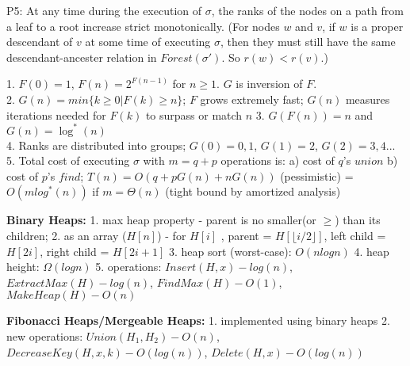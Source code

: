 P5: At any time during the execution of $\sigma$, the ranks of the nodes
on a path from a leaf to a root increase strict monotonically.
(For nodes $w$ and $v$, if $w$ is a proper descendant of $v$ at some time of executing $\sigma$,
then they must still have the same descendant-ancester relation in $Forest(\sigma')$. So $r(w)<r(v)$.)

1. $F(0) = 1$, $F(n) = 2^{F(n-1)}$ for $n \ge 1$. $G$ is inversion of $F$. \\
2. $G(n) = min\{k \ge 0 | F(k) \ge n\}$; $F$ grows extremely fast; $G(n)$ measures iterations needed for $F(k)$ to surpass or match $n$ 
3. $G(F(n)) = n$ and $G(n) = \log^*(n)$\\
4. Ranks are distributed into groups; $G(0) = {0,1}$, $G(1) = {2}$, $G(2) = {3,4}$...\\
5. Total cost of executing $\sigma$ with $m=q+p$ operations is:  
a) cost of $q$'s $union$ b) cost of $p$'s $find$; $T(n) = O(q+pG(n)+nG(n))$ (pessimistic) = $O(mlog^*(n))$ if $m=\Theta(n)$ (tight bound by amortized analysis)


\textbf{Binary Heaps:} 
1. max heap property - parent is no smaller(or $\ge$) than its children;
2. as an array ($H[n]$) - for $H[i]$ , parent = $H[\lfloor i/2 \rfloor]$, 
left child = $H[2i]$, right child = $H[2i+1]$
3. heap sort (worst-case): $O(nlogn)$
4. heap height: $\Omega(logn)$
5. operations: $Insert(H, x)-log(n)$, $ExtractMax(H)-log(n)$, 
$FindMax(H)-O(1)$, $MakeHeap(H)-O(n)$

\textbf{Fibonacci Heaps/Mergeable Heaps: }
1. implemented using binary heaps
2. new operations: $Union(H_1,H_2)-O(n)$, $DecreaseKey(H,x,k)-O(log(n))$, 
$Delete(H,x)-O(log(n))$

% 
